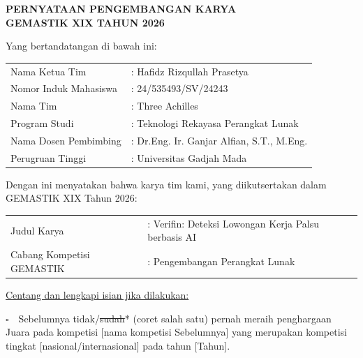 \documentclass[10pt]{article}
\newcommand{\dotline}[1]{\makebox[#1]{\dotfill}}
\begin{document}
\begin{center}
{\fontsize{13}{15}\selectfont\bfseries
PERNYATAAN PENGEMBANGAN KARYA\\
GEMASTIK XIX TAHUN 2026}
\end{center}

\vspace{0.8em}

Yang bertandatangan di bawah ini:

\vspace{0.3em}

\begin{tabularx}{\textwidth}{@{}p{4.2cm}l@{}}
Nama Ketua Tim & : Hafidz Rizqullah Prasetya \\[3pt]
Nomor Induk Mahasiswa & : 24/535493/SV/24243 \\[3pt]
Nama Tim & : Three Achilles \\[3pt]
Program Studi & : Teknologi Rekayasa Perangkat Lunak \\[3pt]
Nama Dosen Pembimbing & : Dr.Eng. Ir. Ganjar Alfian, S.T., M.Eng. \\[3pt]
Perugruan Tinggi & : Universitas Gadjah Mada \\
\end{tabularx}

\vspace{0.5em}

Dengan ini menyatakan bahwa karya tim kami, yang diikutsertakan dalam GEMASTIK XIX Tahun 2026:

\vspace{0.3em}

\begin{tabularx}{\textwidth}{@{}p{4.2cm}l@{}}
Judul Karya & : Verifin: Deteksi Lowongan Kerja Palsu berbasis AI \\[3pt]
Cabang Kompetisi GEMASTIK & : Pengembangan Perangkat Lunak \\
\end{tabularx}

\vspace{0.8em}

\underline{Centang dan lengkapi isian jika dilakukan:}

\vspace{0.3em}

$\square$~~Sebelumnya tidak/\sout{sudah}* (coret salah satu) pernah meraih penghargaan Juara \dotline{3cm} pada kompetisi [nama kompetisi Sebelumnya] yang merupakan kompetisi tingkat [nasional/internasional] pada tahun [Tahun].
\end{document}
